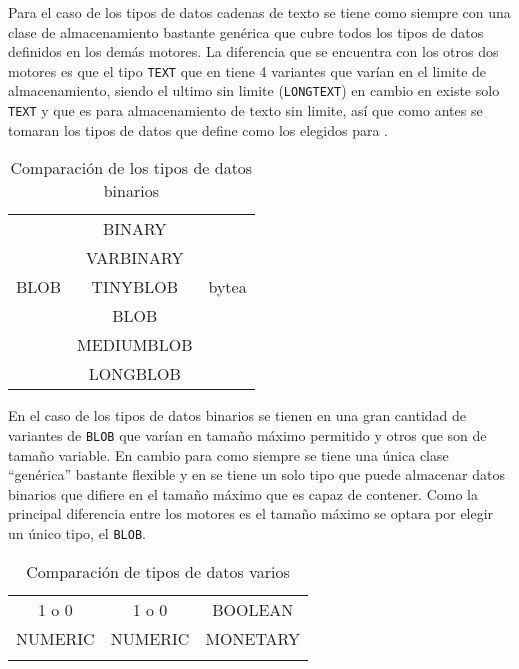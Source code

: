 Para el caso de los tipos de datos cadenas de texto se tiene como siempre \s con una clase de almacenamiento bastante genérica que cubre todos los tipos de datos definidos en los demás motores. La diferencia que se encuentra con los otros dos motores es que el tipo \verb=TEXT= que en \m tiene 4 variantes que varían en el limite de almacenamiento, siendo el ultimo sin limite (\verb=LONGTEXT=) en cambio en \p existe solo \verb=TEXT= y que es para almacenamiento de texto sin limite, así que como antes se tomaran los tipos de datos que define \p como los elegidos para \cc. 
%
\begin{table}[h]
\begin{center}
\begin{tabular}{|c|c|c|}
\hline \s & \m & \p \\ 
\hline  & BINARY &  \\  
 & VARBINARY &  \\ 
 BLOB & TINYBLOB & bytea \\ 
 & BLOB &  \\ 
 & MEDIUMBLOB &  \\
& LONGBLOB &  \\ 
\hline 
\end{tabular} 
\end{center}
\caption{Comparación de los tipos de datos binarios}
\end{table}
%

En el caso de los tipos de datos binarios se tienen en \m una gran cantidad de variantes de \verb=BLOB= que varían en tamaño máximo permitido y otros que son de tamaño variable. En cambio para \s como siempre se tiene una única clase ``genérica'' bastante flexible y en \p se tiene un solo tipo que puede almacenar datos binarios que difiere en el tamaño máximo que es capaz de contener. Como la principal diferencia entre los motores es el tamaño máximo se optara por elegir un único tipo, el \verb=BLOB=.
%
\begin{table}[h]
\begin{center}
\begin{tabular}{|c|c|c|}
\hline \s & \m & \p \\ 
\hline 1 o 0 & 1 o 0 & BOOLEAN \\  
\hline NUMERIC & NUMERIC & MONETARY \\  
&  &  \\  
\hline 
\end{tabular} 
\end{center}
\caption{Comparación de tipos de datos varios}
\end{table}
%

